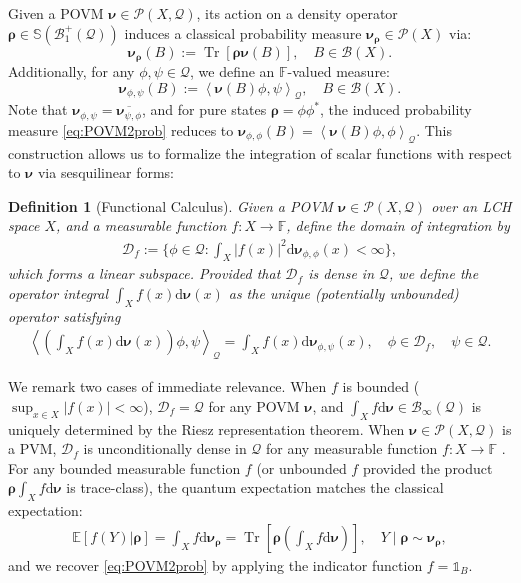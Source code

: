 \documentclass[noinfoline]{imsart}\setcounter{tocdepth}{2}
\renewcommand{\b}[1]{\mathbb{#1}} %
\newcommand{\s}[1]{\mathscr{#1}} %
\renewcommand{\c}[1]{\mathcal{#1}} %
\newcommand{\ds}[1]{\mathds{#1}} %
\newcommand{\mb}[1]{\boldsymbol{#1}} %
\newcommand{\rd}{\mathrm{d}} %
\newcommand{\tr}[1]{\operatorname{Tr}\left[#1\right]}
\newcommand{\innpr}[2]{{\left\langle {#1},{#2}\right\rangle}} %
\theoremstyle{plain}
\newtheorem{definition}[theorem]{Definition}
\begin{document}
Given a POVM $\mb{\nu} \in \s{P}(X, \c{Q})$, its action on a density operator $\mb{\rho} \in \b{S}(\c{B}_{1}^{+}(\c{Q}))$ induces a classical probability measure $\mb{\nu}_{\mb{\rho}} \in \s{P}(X)$ via:
\begin{equation}\label{eq:POVM2prob}
    \mb{\nu}_{\mb{\rho}} (B) := \tr{\mb{\rho} \mb{\nu}(B)}, \quad B \in \s{B}(X).
\end{equation}
Additionally, for any $\phi, \psi \in \c{Q}$, we define an $\b{F}$-valued measure:
\begin{equation*}
    \mb{\nu}_{\phi, \psi} (B) := \innpr{\mb{\nu}(B) \phi}{\psi}_{\c{Q}}, \quad B \in \s{B}(X).
\end{equation*}
Note that $\mb{\nu}_{\phi, \psi} = \overline{\mb{\nu}_{\psi, \phi}}$, and for pure states $\mb{\rho} = \phi \phi^{*}$, the induced probability measure \eqref{eq:POVM2prob} reduces to $\mb{\nu}_{\phi, \phi}(B) = \innpr{\mb{\nu}(B) \phi}{\phi}_{\c{Q}}$. This construction allows us to formalize the integration of scalar functions with respect to $\mb{\nu}$ via sesquilinear forms:

\begin{definition}[Functional Calculus]
Given a POVM $\mb{\nu} \in \s{P}(X, \c{Q})$ over an LCH space $X$, and a measurable function $f: X \to \b{F}$, define the domain of integration by
\begin{align*}
    \c{D}_{f} := \Big\{ \phi \in \c{Q} : \int_{X} |f(x)|^{2} \rd \mb\nu_{\phi, \phi}(x) < \infty \Big\},
\end{align*}
which forms a linear subspace. Provided that $\c{D}_{f}$ is dense in $\c{Q}$, we define the operator integral $\int_{X} f(x) \rd \mb{\nu} (x)$ as the unique (potentially unbounded) operator satisfying
\begin{align*}
    \innpr{\left( \int_{X} f(x) \rd \mb{\nu} (x) \right) \phi}{\psi}_{\c{Q}} = \int_{X} f(x) \rd \mb\nu_{\phi, \psi}(x), \quad \phi \in \c{D}_{f}, \quad \psi \in \c{Q}.
\end{align*}
\end{definition}

We remark two cases of immediate relevance. 
When $f$ is bounded ($\sup_{x \in X} |f(x)| < \infty$), $\c{D}_{f} = \c{Q}$ for any POVM $\mb{\nu}$, and $\int_{X} f \rd \mb{\nu} \in \c{B}_{\infty}(\c{Q})$ is uniquely determined by the Riesz representation theorem.
When $\mb{\nu} \in \s{P}(X, \c{Q})$ is a PVM, $\c{D}_{f}$ is unconditionally dense in $\c{Q}$ for any measurable function $f: X \to \b{F}$ \cite{hall2013quantum}. 
For any bounded measurable function $f$ (or unbounded $f$ provided the product $\mb{\rho} \int_{X} f \rd \mb{\nu}$ is trace-class), the quantum expectation matches the classical expectation: 
\begin{align*}
    \b{E}[f(Y) \vert \mb{\rho}] = \int_{X} f \rd \mb{\nu}_{\mb{\rho}} = \tr{\mb{\rho} \left( \int_{X} f \rd \mb{\nu} \right) }, \quad Y \mid \mb{\rho} \sim \mb{\mb{\nu}_{\rho}},
\end{align*}
and we recover \eqref{eq:POVM2prob} by applying the indicator function $f = \ds{1}_{B}$.
\end{document}
